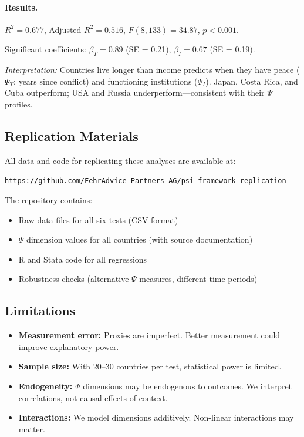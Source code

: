 \documentclass[12pt,a4paper]{article}
\begin{document}
\paragraph{Results.}
$R^2 = 0.677$, Adjusted $R^2 = 0.516$, $F(8,133) = 34.87$, $p < 0.001$.

Significant coefficients: $\beta_T = 0.89$ (SE = 0.21), $\beta_I = 0.67$ (SE = 0.19).

\textit{Interpretation:} Countries live longer than income predicts when they have peace ($\Psi_T$: years since conflict) and functioning institutions ($\Psi_I$). Japan, Costa Rica, and Cuba outperform; USA and Russia underperform---consistent with their $\Psi$ profiles.

\subsection{Replication Materials}

All data and code for replicating these analyses are available at:

\begin{center}
\texttt{https://github.com/FehrAdvice-Partners-AG/psi-framework-replication}
\end{center}

The repository contains:
\begin{itemize}
    \item Raw data files for all six tests (CSV format)
    \item $\Psi$ dimension values for all countries (with source documentation)
    \item R and Stata code for all regressions
    \item Robustness checks (alternative $\Psi$ measures, different time periods)
\end{itemize}

\subsection{Limitations}

\begin{itemize}
    \item \textbf{Measurement error:} Proxies are imperfect. Better measurement could improve explanatory power.
    \item \textbf{Sample size:} With 20--30 countries per test, statistical power is limited.
    \item \textbf{Endogeneity:} $\Psi$ dimensions may be endogenous to outcomes. We interpret correlations, not causal effects of context.
    \item \textbf{Interactions:} We model dimensions additively. Non-linear interactions may matter.
\end{itemize}
\end{document}
